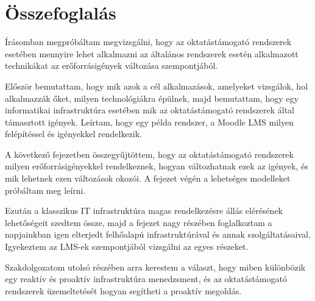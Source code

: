 \chapter{Összefoglalás}

Írásomban megpróbáltam megvizsgálni, hogy az oktatástámogató rendszerek esetében mennyire lehet alkalmazni az általános rendszerek esetén alkalmazott technikákat az erőforrásigények változása szempontjából.

Először bemutattam, hogy mik azok a cél alkalmazások, amelyeket vizsgálok, hol alkalmazzák őket, milyen technológiákra épülnek, majd bemutattam, hogy egy informatikai infrastruktúra esetében mik az oktatástámogató rendszerek által támasztott igények. Leírtam, hogy egy példa rendszer, a Moodle LMS milyen felépítéssel és igényekkel rendelkezik.

A következő fejezetben összegyűjtöttem, hogy az oktatástámogató rendszerek milyen erőforrásigényekkel rendelkeznek, hogyan változhatnak ezek az igények, és mik lehetnek ezen változások okozói. A fejezet végén a lehetséges modelleket próbáltam meg leírni.

Ezután a klasszikus IT infrastruktúra magas rendelkezésre állás elérésének lehetőségeit szedtem össze, majd a fejezet nagy részében foglalkoztam a napjainkban igen elterjedt felhőalapú infrastruktúrával és annak szolgáltatásaival. Igyekeztem az LMS-ek szempontjából vizsgálni az egyes részeket.

Szakdolgozatom utolsó részében arra kerestem a választ, hogy miben különbözik egy reaktív és proaktív infrastruktúra menedzsment, és az oktatástámogató rendszerek üzemeltetését hogyan segítheti a proaktív megoldás.

